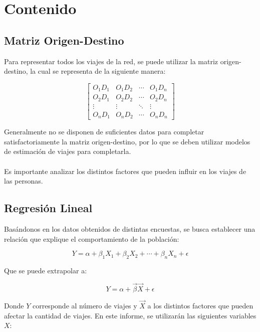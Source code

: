 \documentclass[12pt]{article} %
\begin{document}
\section{Contenido}

\subsection{Matriz Origen-Destino}

Para representar todos los viajes de la red, se puede utilizar la matriz origen-destino, la cual se representa de la siguiente manera:

\begin{equation}
    \begin{bmatrix}
        O_{1}D_{1} & O_{1}D_{2} & \cdots & O_{1}D_{n} \\
        O_{2}D_{1} & O_{2}D_{2} & \cdots & O_{2}D_{n} \\
        \vdots & \vdots & \ddots & \vdots \\
        O_{n}D_{1} & O_{n}D_{2} & \cdots & O_{n}D_{n}
    \end{bmatrix}
\end{equation}

Generalmente no se disponen de suficientes datos para completar satisfactoriamente la matriz origen-destino, por lo que se deben utilizar modelos de estimación de viajes para completarla.
\\ \\
Es importante analizar los distintos factores que pueden influir en los viajes de las personas.

\subsection{Regresión Lineal}

Basándonos en los datos obtenidos de distintas encuestas, se busca establecer una relación que explique el comportamiento de la población:

\begin{equation}
    Y = \alpha + \beta_{1}X_{1} + \beta_{2}X_{2} + \cdots + \beta_{n}X_{n} + \epsilon
\end{equation}

Que se puede extrapolar a:

\begin{equation}
    Y = \alpha + \vec{\beta}\vec{X} + \epsilon
\end{equation}

Donde $Y$ corresponde al número de viajes y $\vec{X}$ a los distintos factores que pueden afectar la cantidad de viajes. En este informe, se utilizarán las siguientes variables $X$:
\end{document}

